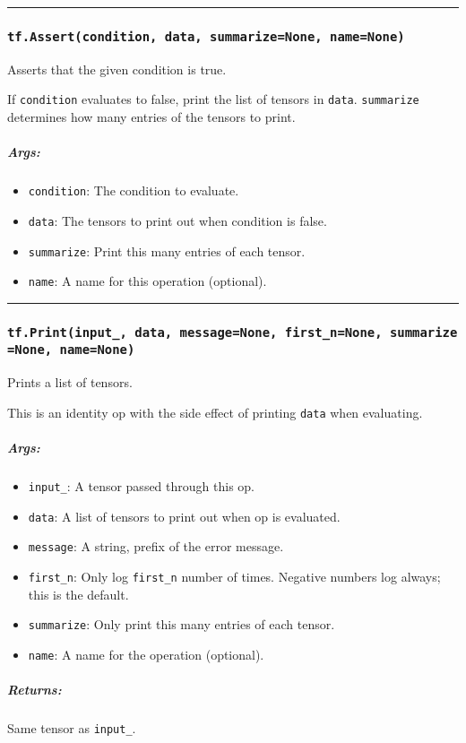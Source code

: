 \begin{center}\rule{0.5\linewidth}{\linethickness}\end{center}

\subsubsection{\texorpdfstring{\texttt{tf.Assert(condition,\ data,\ summarize=None,\ name=None)}
}{tf.Assert(condition, data, summarize=None, name=None) }}\label{tf.assertcondition-data-summarizenone-namenone}

Asserts that the given condition is true.

If \texttt{condition} evaluates to false, print the list of tensors in
\texttt{data}. \texttt{summarize} determines how many entries of the
tensors to print.

\subparagraph{Args: }\label{args-21}

\begin{itemize}
\tightlist
\item
  \texttt{condition}: The condition to evaluate.
\item
  \texttt{data}: The tensors to print out when condition is false.
\item
  \texttt{summarize}: Print this many entries of each tensor.
\item
  \texttt{name}: A name for this operation (optional).
\end{itemize}

\begin{center}\rule{0.5\linewidth}{\linethickness}\end{center}

\subsubsection{\texorpdfstring{\texttt{tf.Print(input\_,\ data,\ message=None,\ first\_n=None,\ summarize=None,\ name=None)}
}{tf.Print(input\_, data, message=None, first\_n=None, summarize=None, name=None) }}\label{tf.printinputux5f-data-messagenone-firstux5fnnone-summarizenone-namenone}

Prints a list of tensors.

This is an identity op with the side effect of printing \texttt{data}
when evaluating.

\subparagraph{Args: }\label{args-22}

\begin{itemize}
\tightlist
\item
  \texttt{input\_}: A tensor passed through this op.
\item
  \texttt{data}: A list of tensors to print out when op is evaluated.
\item
  \texttt{message}: A string, prefix of the error message.
\item
  \texttt{first\_n}: Only log \texttt{first\_n} number of times.
  Negative numbers log always; this is the default.
\item
  \texttt{summarize}: Only print this many entries of each tensor.
\item
  \texttt{name}: A name for the operation (optional).
\end{itemize}

\subparagraph{Returns: }\label{returns-22}

Same tensor as \texttt{input\_}.

